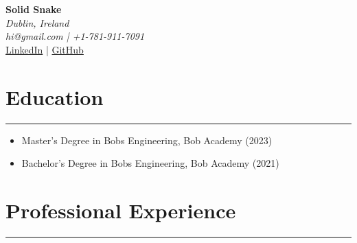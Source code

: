 \documentclass[a4paper,10pt]{article}
\makeatletter
\renewcommand{\maketitle}{%
\begin{center}
    {\Huge \textbf{Solid Snake}} \\
    \vspace{2mm}
    \textit{Dublin, Ireland} \\
    \textit{hi@gmail.com | +1-781-911-7091} \\
    \href{https://linkedin.com/in/thezucc}{LinkedIn} | \href{https://github.com/lol}{GitHub}
\end{center}}
\makeatother
\begin{document}
\maketitle
\section*{Education}
\rule{\textwidth}{0.5pt}
\begin{itemize}[leftmargin=*]
\item Master's Degree in Bobs Engineering, Bob Academy (2023)
\item Bachelor's Degree in Bobs Engineering, Bob Academy (2021)
\end{itemize}

\section*{Professional Experience}
\rule{\textwidth}{0.5pt}
\end{document}
